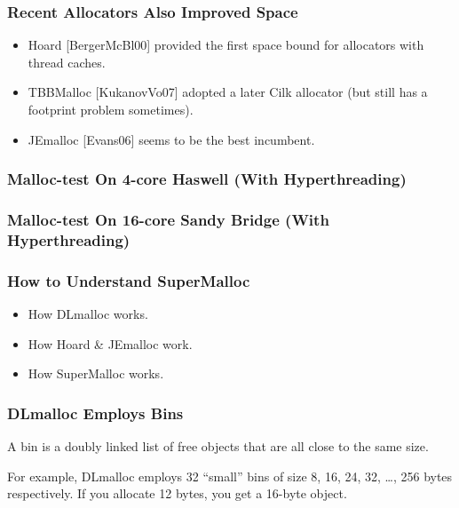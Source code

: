 \documentclass[xcolor=dvipsnames,14pt]{beamer}
\begin{document}
\begin{frame}[fragile]
\frametitle{Recent Allocators Also Improved Space}

\begin{itemize}
\item Hoard [BergerMcBl00] provided the first space bound for allocators
with thread caches.
\item TBBMalloc [KukanovVo07] adopted a later Cilk allocator (but still has a footprint problem sometimes).
\item JEmalloc [Evans06] seems to be the best incumbent.
\end{itemize}


\end{frame}

\begin{frame}
\frametitle{Malloc-test On 4-core Haswell (With Hyperthreading)}


\end{frame}
\begin{frame}
\frametitle{Malloc-test On 16-core Sandy Bridge (With Hyperthreading)}


\end{frame}

\begin{frame}
\frametitle{How to Understand SuperMalloc}

\begin{itemize}
\item How DLmalloc works.
\item How Hoard \& JEmalloc work.
\item How SuperMalloc works.
\end{itemize}

\end{frame}

\begin{frame}
\frametitle{DLmalloc Employs Bins}
A bin is a doubly linked list of free objects that are all close to the same size.

\vfill

For example, DLmalloc employs 32 ``small'' bins of size 8, 16, 24, 32,
\ldots, 256 bytes respectively.  If you allocate 12 bytes, you get a 16-byte object.

\end{frame}
\end{document}
